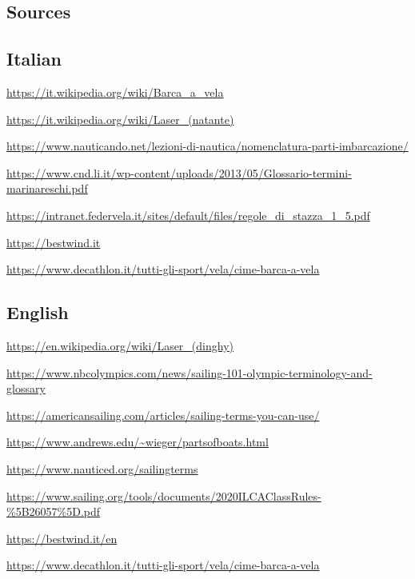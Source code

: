 \documentclass[a4paper, 12pt, twoside]{article}
\begin{document}
    \begin{indt}{\section{Sources}} %
        \begin{indt}{\subsection{Italian}} %
            \url{https://it.wikipedia.org/wiki/Barca_a_vela}

            \url{https://it.wikipedia.org/wiki/Laser_(natante)}

            \href{https://www.nauticando.net/lezioni-di-nautica/nomenclatura-parti-imbarcazione/}{{https://www.nauticando.net/lezioni-di-nautica/nomenclatura-parti-imbarcazione/}}

            \href{https://www.cnd.li.it/wp-content/uploads/2013/05/Glossario-termini-marinareschi.pdf}{https://www.cnd.li.it/wp-content/uploads/2013/05/Glossario-termini-marinareschi.pdf}

            \url{https://intranet.federvela.it/sites/default/files/regole_di_stazza_1_5.pdf}

            \url{https://bestwind.it}
            
            \url{https://www.decathlon.it/tutti-gli-sport/vela/cime-barca-a-vela}
        \end{indt} %

        \begin{indt}{\subsection{English}} %
            \url{https://en.wikipedia.org/wiki/Laser_(dinghy)}

            \href{https://www.nbcolympics.com/news/sailing-101-olympic-terminology-and-glossary}{https://www.nbcolympics.com/news/sailing-101-olympic-terminology-and-glossary}

            \url{https://americansailing.com/articles/sailing-terms-you-can-use/}

            \url{https://www.andrews.edu/~wieger/partsofboats.html}

            \url{https://www.nauticed.org/sailingterms}

            \url{https://www.sailing.org/tools/documents/2020ILCAClassRules-%5B26057%5D.pdf}

            \url{https://bestwind.it/en}

            \url{https://www.decathlon.it/tutti-gli-sport/vela/cime-barca-a-vela}
        \end{indt} %
    \end{indt} %
    
\end{document}
